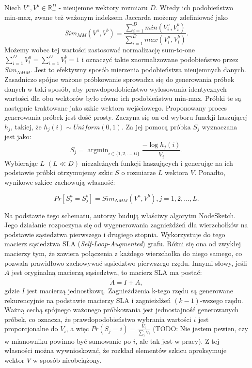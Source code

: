             Niech $V^a, V^b \in \mathbb{R}_{+}^{D}$ - nieujemne wektory rozmiaru $D$. Wtedy ich podobieństwo min-max, zwane też ważonym indeksem Jaccarda możemy zdefiniować jako 
            \[
                Sim_{MM}(V^a, V^b) = \frac{\sum \limits_{i = 1}^D min(V_i^{a}, V_i^{b})}{\sum \limits_{i = 1}^D max(V_i^{a}, V_i^{b})}.
            \]
            Możemy wobec tej wartości zastosować normalizację sum-to-one $\sum \limits_{i = 1}^D V_{i}^{a} = \sum \limits_{i = 1}^D V_{i}^{b} = 1$ i oznaczyć takie znormalizowane podobieństwo przez $Sim_{NMM}$. Jest to efektywny sposób mierzenia podobieństwa nieujemnych danych\cite{10.1145/2783258.2783406}. Zasadniczo spójne ważone próbkowanie sprowadza się do generowania próbek danych w taki sposób, aby prawdopodobieństwo wylosowania identycznych wartości dla obu wektorów było równe ich podobieństwu min-max. Próbki te są następnie traktowane jako szkic wektora wejściowego. Proponowany proces generowania próbek jest dość prosty. Zaczyna się on od wyboru funckji haszującej $h_j$, takiej, że $h_j(i) \sim Uniform(0,1)$. Za jej pomocą próbka $S_j$ wyznaczana jest jako:
            \begin{equation} \label{eq:node_sketch_1}  
                S_j = \mathop{argmin}_{i \in \{1,2,\dots, D\}} \frac{-\log h_{j}(i)}{V_i}.
            \end{equation}
            Wybierając $L$ $(L \ll D)$ niezależnych funkcji haszujących i generując na ich podstawie próbki otrzymujemy szkic $S$ o rozmiarze $L$ wektora $V$. Ponadto, wynikowe szkice zachowują własność:

            \begin{equation} \label{eq:node_sketch_2}  
                Pr[S_{j}^{a} = S_{j}^{b}] = Sim_{NMM}(V^a, V^b), j = 1,2,\dots,L.
            \end{equation}

            Na podstawie tego schematu, autorzy budują właściwy algorytm NodeSketch. Jego działanie rozpoczyna się od wygenerowania zagnieżdżeń dla wierzchołków na podstawie sąsiedztwa pierwszego i drugiego stopnia. Wykorzystuje do tego macierz sąsiedztwa SLA (\emph{Self-Loop-Augmented}) grafu. Różni się ona od zwykłej macierzy tym, że zawiera połączenia z każdego wierzchołka do niego samego, co pozwala prawidłowo zachowywać sąsiedztwo pierwszego rzędu. Innymi słowy, jeśli $A$ jest oryginalną macierzą sąsiedztwa, to macierz SLA ma postać:
            \[
                \tilde{A} = I + A,
            \]
            gdzie $I$ jest macierzą jednostkową. Zagnieżdżenia k-tego rzędu są generowane rekurencyjnie na podstawie macierzy SLA i zagnieżdżeń $(k - 1)$-wszego rzędu. Ważną cechą spójnego ważonego próbkowania jest jednostajność generowanych próbek, co oznacza, że prawdopodobieństwo wybrania wartości $i$ jest proporcjonalne do $V_i$, a więc $Pr(S_j = i) = \frac{V_i}{\sum_{i} V_i}$ (TODO: Nie jestem pewien, czy w mianowniku powinno być sumowanie po $i$, ale tak jest w pracy). Z tej własności można wywnioskować, że rozkład elementów szkicu aproksymuje wektor $V$ w sposób nieobciążony. 
            

